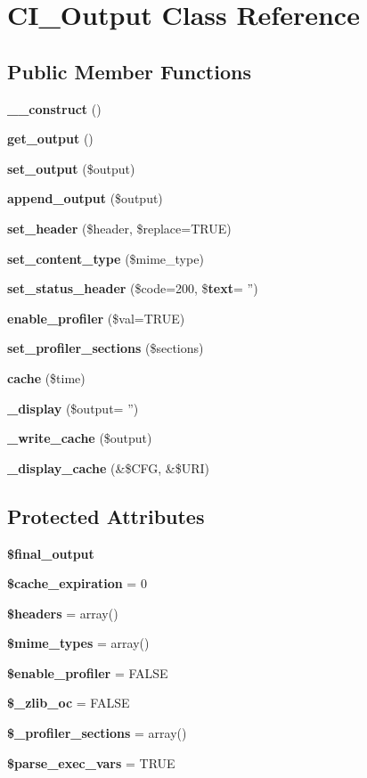 \section{C\-I\-\_\-\-Output Class Reference}
\label{class_c_i___output}
\subsection*{Public Member Functions}
\begin{DoxyCompactItemize}
\item 
{\bf \-\_\-\-\_\-construct} ()
\item 
{\bf get\-\_\-output} ()
\item 
{\bf set\-\_\-output} (\$output)
\item 
{\bf append\-\_\-output} (\$output)
\item 
{\bf set\-\_\-header} (\$header, \$replace=T\-R\-U\-E)
\item 
{\bf set\-\_\-content\-\_\-type} (\$mime\-\_\-type)
\item 
{\bf set\-\_\-status\-\_\-header} (\$code=200, \${\bf text}= '')
\item 
{\bf enable\-\_\-profiler} (\$val=T\-R\-U\-E)
\item 
{\bf set\-\_\-profiler\-\_\-sections} (\$sections)
\item 
{\bf cache} (\$time)
\item 
{\bf \-\_\-display} (\$output= '')
\item 
{\bf \-\_\-write\-\_\-cache} (\$output)
\item 
{\bf \-\_\-display\-\_\-cache} (\&\$C\-F\-G, \&\$U\-R\-I)
\end{DoxyCompactItemize}
\subsection*{Protected Attributes}
\begin{DoxyCompactItemize}
\item 
{\bf \$final\-\_\-output}
\item 
{\bf \$cache\-\_\-expiration} = 0
\item 
{\bf \$headers} = array()
\item 
{\bf \$mime\-\_\-types} = array()
\item 
{\bf \$enable\-\_\-profiler} = F\-A\-L\-S\-E
\item 
{\bf \$\-\_\-zlib\-\_\-oc} = F\-A\-L\-S\-E
\item 
{\bf \$\-\_\-profiler\-\_\-sections} = array()
\item 
{\bf \$parse\-\_\-exec\-\_\-vars} = T\-R\-U\-E
\end{DoxyCompactItemize}


